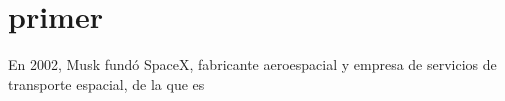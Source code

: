 \documentclass[a4paper,12pt]{article}
\begin{document}
\section{primer}
En 2002, Musk fundó SpaceX, fabricante aeroespacial y empresa de servicios de transporte espacial, de la que es
\end{document}

